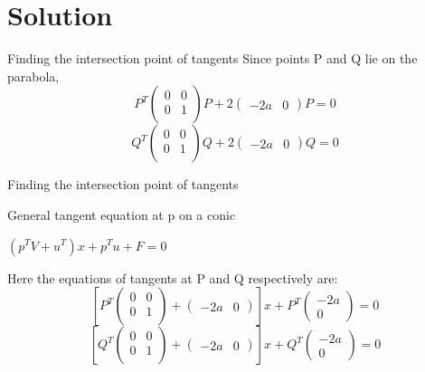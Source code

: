 \documentclass[12pt]{beamer}
\begin{document}
\section{Solution}
    \begin{frame}{Finding the intersection point of tangents}
    Since points P and Q lie on the parabola, \\
    \begin{equation}
        P^T \left( {\begin{array}{cc} 0 & 0 \\ 0 & 1 \\ \end{array}} \right) P + 2 \left({\begin{array}{cc}-2a &  0\end{array}}\right)P = 0  \end{equation} 
        \begin{equation}
        Q^T \left( {\begin{array}{cc} 0 & 0 \\ 0 & 1 \\ \end{array}} \right) Q + 2 \left({\begin{array}{cc}-2a &  0\end{array}}\right)Q = 0
        \end{equation}
    \end{frame}
    \begin{frame}{Finding the intersection point of tangents}
    \begin{block}{General tangent equation at p on a conic}
        \begin{center}
            $(p^TV + u^T)x + p^Tu + F= 0$
        \end{center}
    \end{block}
    Here the equations of tangents at P and Q respectively are: \\
    \begin{equation}
        \left[ P^T \left( {\begin{array}{cc} 0 & 0 \\ 0 & 1 \\ \end{array}} \right) + \left({\begin{array}{cc}-2a &  0\end{array}}\right) \right]x + P^T \left({\begin{array}{c}-2a \\  0\end{array}}\right) = 0
    \end{equation}
    \begin{equation}
        \left[ Q^T \left( {\begin{array}{cc} 0 & 0 \\ 0 & 1 \\ \end{array}} \right) + \left({\begin{array}{cc}-2a &  0\end{array}}\right) \right]x + Q^T \left({\begin{array}{c}-2a \\  0\end{array}}\right) = 0
    \end{equation}
    \end{frame}
\end{document}
